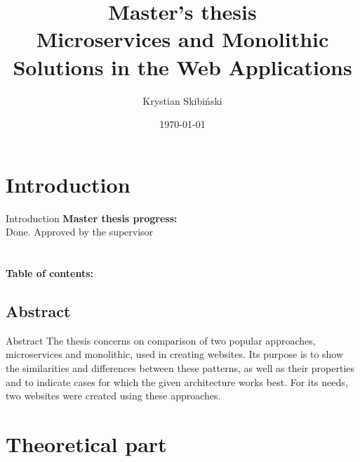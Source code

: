 \documentclass{beamer}
\title[Microservices and Monolithic Solutions]{
	{\small Master's thesis}\\
	Microservices and Monolithic Solutions in the Web Applications
}
\author[Krystian Skibiński]{Krystian Skibiński
}
\date{\today}
\begin{document}
	\section{Introduction}
	\begin{frame}[plain]
		\maketitle	
	\end{frame}
	
	\begin{frame}{Introduction}{}
		\textbf{Master thesis progress:}\\
		Done. Approved by the supervisor \checkmark \\
		~\\
		~\\
		\textbf{Table of contents:}
		\tableofcontents[sections={1-2}]
			\framebreak
		\tableofcontents[sections={3}]
	\end{frame}
	
	\subsection{Abstract}
	\begin{frame}{Abstract}
	The thesis concerns on comparison of two popular approaches, microservices and monolithic, used in creating websites. Its purpose is to show the similarities and differences between these patterns, as well as their properties and to indicate cases for which the given architecture works best. For its needs, two websites were created using these approaches.
	\end{frame}

	
	\section{Theoretical part}
\end{document}
